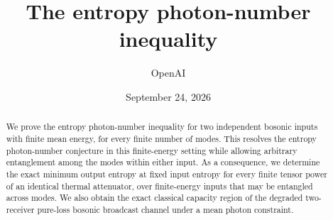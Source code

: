 \documentclass[11pt]{article}
\title{The entropy photon-number inequality}
\author{OpenAI}
\date{September 24, 2026}
\theoremstyle{definition}
\theoremstyle{remark}
\numberwithin{equation}{section}
\begin{document}
\maketitle
\begin{abstract}
We prove the entropy photon-number inequality for two independent bosonic inputs with finite mean energy, for every finite number of modes. This resolves the entropy photon-number conjecture in this finite-energy setting while allowing arbitrary entanglement among the modes within either input. As a consequence, we determine the exact minimum output entropy at fixed input entropy for every finite tensor power of an identical thermal attenuator, over finite-energy inputs that may be entangled across modes. We also obtain the exact classical capacity region of the degraded two-receiver pure-loss bosonic broadcast channel under a mean photon constraint.
\end{abstract}
{\small\tableofcontents}
\clearpage








\end{document}

